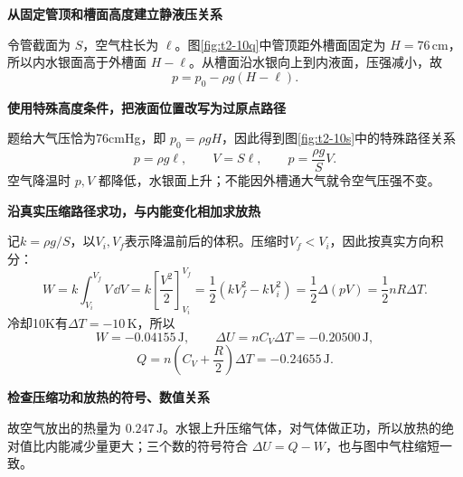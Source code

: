 \begin{solution}\textbf{从固定管顶和槽面高度建立静液压关系}\par\nobreak
令管截面为 $S$，空气柱长为 $\ell$。图\ref{fig:t2-10q}中管顶距外槽面固定为 $H=76\,\mathrm{cm}$，所以内水银面高于外槽面 $H-\ell$。从槽面沿水银向上到内液面，压强减小，故
\[p=p_0-\rho g(H-\ell).\]


\par\medskip{}\noindent\textbf{使用特殊高度条件，把液面位置改写为过原点路径}\par\nobreak
题给大气压恰为76cmHg，即 $p_0=\rho gH$，因此得到图\ref{fig:t2-10s}中的特殊路径关系
\[p=\rho g\ell,\qquad V=S\ell,\qquad p=\frac{\rho g}{S}V.\]
空气降温时 $p,V$ 都降低，水银面上升；不能因外槽通大气就令空气压强不变。



\par\medskip{}\noindent\textbf{沿真实压缩路径求功，与内能变化相加求放热}\par\nobreak
记$k=\rho g/S$，以$V_i,V_f$表示降温前后的体积。压缩时$V_f<V_i$，因此按真实方向积分：
\[
W=k\int_{V_i}^{V_f}V\,\dd V
=k\left[\frac{V^2}{2}\right]_{V_i}^{V_f}
=\frac12(kV_f^2-kV_i^2)
=\frac12\Delta(pV)=\frac12nR\Delta T.
\]
冷却10K有$\Delta T=-10\,\mathrm K$，所以
\[W=-0.04155\,\mathrm J,\qquad \Delta U=nC_V\Delta T=-0.20500\,\mathrm J,\]
\[\boxed{Q=n\left(C_V+\frac R2\right)\Delta T=-0.24655\,\mathrm J}.\]


\par\medskip{}\noindent\textbf{检查压缩功和放热的符号、数值关系}\par\nobreak
故空气放出的热量为 $\boxed{0.247\,\mathrm J}$。水银上升压缩气体，对气体做正功，所以放热的绝对值比内能减少量更大；三个数的符号符合 $\Delta U=Q-W$，也与图中气柱缩短一致。
\end{solution}
